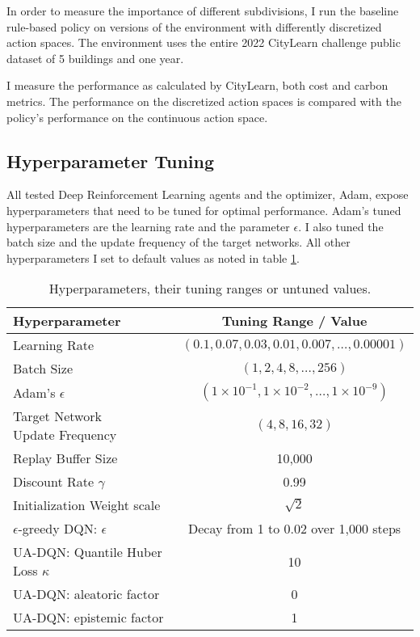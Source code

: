 In order to measure the importance of different subdivisions, I run the baseline rule-based policy on versions of the environment with differently discretized action spaces.
The environment uses the entire 2022 CityLearn challenge public dataset of 5 buildings and one year.

I measure the performance as calculated by CityLearn, both cost and carbon metrics.
The performance on the discretized action spaces is compared with the policy's performance on the continuous action space.

\subsection{Hyperparameter Tuning}
All tested Deep Reinforcement Learning agents and the optimizer, Adam, expose hyperparameters that need to be tuned for optimal performance.
Adam's tuned hyperparameters are the learning rate and the parameter $\epsilon$.
I also tuned the batch size and the update frequency of the target networks.
All other hyperparameters I set to default values as noted in table \ref{tab:tuning}.

\begin{table}
    \centering
    \caption{Hyperparameters, their tuning ranges or untuned values.}
    \label{tab:tuning}
    \begin{tabular}{l|c}
        Hyperparameter & Tuning Range / Value \\ \hline
        Learning Rate  & $(0.1, 0.07, 0.03, 0.01, 0.007,\dots, 0.00001)$\\
        Batch Size     & $(1,2,4,8,\dots ,256)$                             \\
        Adam's $\epsilon$ & $(1\times 10^{-1}, 1\times 10^{-2}, \dots, 1\times 10^{-9})$ \\
        \makecell[l]{Target Network \\ Update Frequency} & $(4, 8, 16, 32)$ \\ \hline
        Replay Buffer Size & 10,000 \\
        Discount Rate $\gamma$ & 0.99 \\
        Initialization Weight scale & $\sqrt{2}$ \\
        $\epsilon$-greedy DQN: $\epsilon$ & Decay from 1 to 0.02 over 1,000 steps \\
        UA-DQN: Quantile Huber Loss $\kappa$ & 10 \\
        UA-DQN: aleatoric factor & 0 \\
        UA-DQN: epistemic factor & 1 \\
    \end{tabular}
\end{table}

